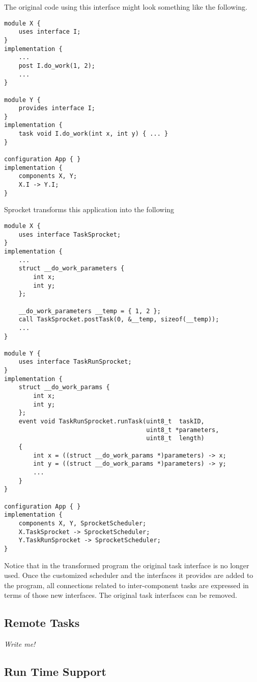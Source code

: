 The original code using this interface might look something like the following.
\begin{verbatim}
module X {
    uses interface I;
}
implementation {
    ...
    post I.do_work(1, 2);
    ...
}

module Y {
    provides interface I;
}
implementation {
    task void I.do_work(int x, int y) { ... }
}

configuration App { }
implementation {
    components X, Y;
    X.I -> Y.I;
}
\end{verbatim}

Sprocket transforms this application into the following
\begin{verbatim}
module X {
    uses interface TaskSprocket;
}
implementation {
    ...
    struct __do_work_parameters {
        int x;
        int y;
    };
    
    __do_work_parameters __temp = { 1, 2 };
    call TaskSprocket.postTask(0, &__temp, sizeof(__temp));
    ...
}

module Y {
    uses interface TaskRunSprocket;
}
implementation {
    struct __do_work_params {
        int x;
        int y;
    };
    event void TaskRunSprocket.runTask(uint8_t  taskID,
                                       uint8_t *parameters,
                                       uint8_t  length)
    {
        int x = ((struct __do_work_params *)parameters) -> x;
        int y = ((struct __do_work_params *)parameters) -> y;
        ...
    }
}

configuration App { }
implementation {
    components X, Y, SprocketScheduler;
    X.TaskSprocket -> SprocketScheduler;
    Y.TaskRunSprocket -> SprocketScheduler;
}
\end{verbatim}

Notice that in the transformed program the original task interface is no longer used. Once the
customized scheduler and the interfaces it provides are added to the program, all connections
related to inter-component tasks are expressed in terms of those new interfaces. The original
task interfaces can be removed.

\subsection{Remote Tasks}

\emph{Write me!}

\subsection{Run Time Support}

